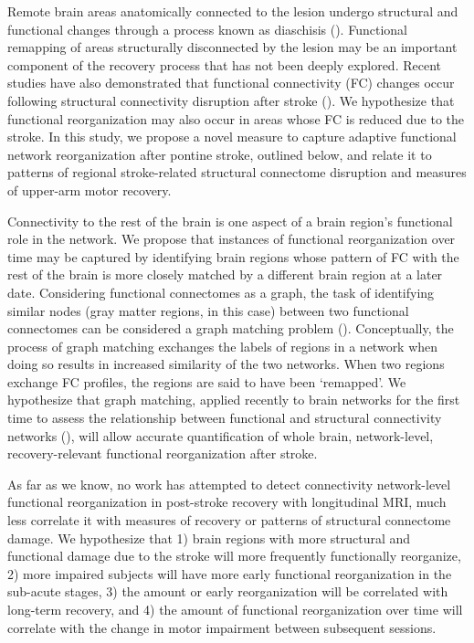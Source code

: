 \documentclass[phd,tocprelim]{cornell}
\begin{document}
    Remote brain areas anatomically connected to the lesion undergo structural and functional changes through a process known as diaschisis (\cite{Carrera2014-ah}). Functional remapping of areas structurally disconnected by the lesion may be an important component of the recovery process that has not been deeply explored. Recent studies have also demonstrated that functional connectivity (FC) changes occur following structural connectivity disruption after stroke (\cite{Lu2011-ow, Griffis2020-hx}). We hypothesize that functional reorganization may also occur in areas whose FC is reduced due to the stroke. In this study, we propose a novel measure to capture adaptive functional network reorganization after pontine stroke, outlined below, and relate it to patterns of regional stroke-related structural connectome disruption and measures of upper-arm motor recovery. 

	Connectivity to the rest of the brain is one aspect of a brain region's functional role in the network. We propose that instances of functional reorganization over time may be captured by identifying brain regions whose pattern of FC with the rest of the brain is more closely matched by a different brain region at a later date. Considering functional connectomes as a graph, the task of identifying similar nodes (gray matter regions, in this case) between two functional connectomes can be considered a graph matching problem (\cite{Conte2004-ro}). Conceptually, the process of graph matching exchanges the labels of regions in a network when doing so results in increased similarity of the two networks. When two regions exchange FC profiles, the regions are said to have been ‘remapped’. We hypothesize that graph matching, applied recently to brain networks for the first time to assess the relationship between functional and structural connectivity networks (\cite{Osmanlioglu2019-ao}), will allow accurate quantification of whole brain, network-level, recovery-relevant functional reorganization after stroke. 	
	
	As far as we know, no work has attempted to detect connectivity network-level functional reorganization in post-stroke recovery with longitudinal MRI, much less correlate it with measures of recovery or patterns of structural connectome damage. We hypothesize that 1) brain regions with more structural and functional damage due to the stroke  will more frequently functionally reorganize, 2) more impaired subjects will have more early functional reorganization in the sub-acute stages, 3) the amount or early reorganization will be correlated with long-term recovery, and 4) the amount of functional reorganization over time will correlate with the change in motor impairment between subsequent sessions.	
	
\end{document}
